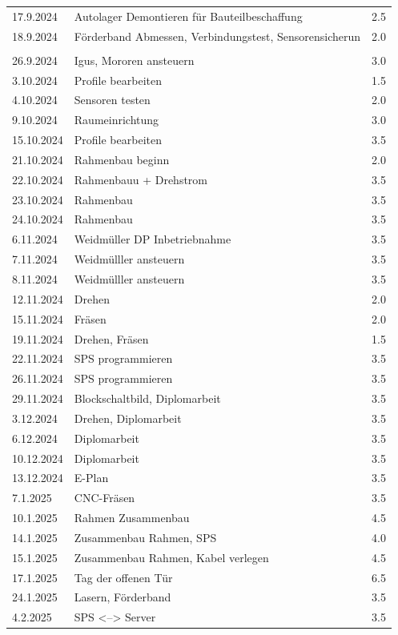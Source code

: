 \begin{longtable}{|l|p{10cm}|r|}
    17.9.2024	&	Autolager Demontieren für Bauteilbeschaffung	&	2.5 \\
    18.9.2024	&	Förderband Abmessen, Verbindungstest, Sensorensicherun	&	2.0 \\\\
    26.9.2024	&	Igus, Mororen ansteuern	&	3.0 \\
    3.10.2024	&	Profile bearbeiten	&	1.5\\
    4.10.2024	&	Sensoren testen	&	2.0\\
    9.10.2024	&	Raumeinrichtung	&	3.0\\
    15.10.2024	&	Profile bearbeiten	&	3.5\\
    21.10.2024	&	Rahmenbau beginn	&	2.0\\
    22.10.2024	&	Rahmenbauu + Drehstrom	&	3.5\\
    23.10.2024	&	Rahmenbau	&	3.5\\
    24.10.2024	&	Rahmenbau	&	3.5\\
    6.11.2024	&	Weidmüller DP Inbetriebnahme	&	3.5\\
    7.11.2024	&	Weidmülller ansteuern	&	3.5\\
    8.11.2024	&	Weidmülller ansteuern	&	3.5\\
    12.11.2024	&	Drehen	&	2.0\\
    15.11.2024	&	Fräsen	&	2.0\\
    19.11.2024	&	Drehen, Fräsen	&	1.5\\
    22.11.2024	&	SPS programmieren	&	3.5\\
    26.11.2024	&	SPS programmieren	&	3.5\\
    29.11.2024	&	Blockschaltbild, Diplomarbeit	&	3.5\\
    3.12.2024	&	Drehen, Diplomarbeit	&	3.5\\
    6.12.2024	&   Diplomarbeit	&	3.5\\
    10.12.2024	&	Diplomarbeit	&	3.5\\
    13.12.2024	&	E-Plan 	&	3.5\\
    7.1.2025	&	CNC-Fräsen	&	3.5\\
    10.1.2025	&	Rahmen Zusammenbau	&	4.5\\
    14.1.2025	&	Zusammenbau Rahmen, SPS	&	4.0\\
    15.1.2025	&	Zusammenbau Rahmen, Kabel verlegen	&	4.5\\
    17.1.2025	&	Tag der offenen Tür	&	6.5\\
    24.1.2025	&	Lasern, Förderband  &	3.5\\
    4.2.2025	&	SPS <--> Server	&	3.5\\

\end{longtable}
